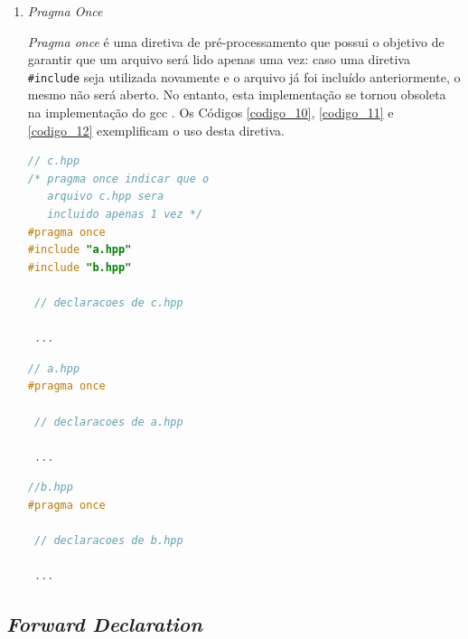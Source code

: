 \begin{enumerate}
\item \textit{Pragma Once}

\textit{Pragma once} é uma diretiva de pré-processamento que possui o objetivo de
 garantir que um arquivo será lido apenas uma vez: caso uma diretiva 
\texttt{\#include} seja utilizada novamente e o arquivo já foi incluído anteriormente,
 o mesmo não será aberto. No entanto, esta implementação se tornou obsoleta 
 na implementação do gcc \cite{gccpragmaonce}. Os Códigos \ref{codigo_10}, \ref{codigo_11} e \ref{codigo_12} exemplificam o uso desta diretiva.



\begin{lstlisting}[language=C++,caption={
                Arquivo c.hpp com guarda de inclusão \texttt{\#pragma once}},
                                                            label=codigo_10]
// c.hpp
/* pragma once indicar que o 
   arquivo c.hpp sera
   incluido apenas 1 vez */
#pragma once            
#include "a.hpp"
#include "b.hpp"

 // declaracoes de c.hpp

 ...

\end{lstlisting}

\begin{lstlisting}[language=C++,caption={
               Arquivo a.hpp com guarda de inclusão \texttt{\#pragma once}},
                                                            label=codigo_11]
// a.hpp
#pragma once 

 // declaracoes de a.hpp

 ...

\end{lstlisting}

\begin{lstlisting}[language=C++,caption={ 
              Arquivo b.hpp com guarda de inclusão \texttt{ \#pragma once}},
                                                            label=codigo_12]
//b.hpp
#pragma once 

 // declaracoes de b.hpp

 ...

\end{lstlisting}

\end{enumerate}

\subsection{\textit{Forward Declaration}}\label{forward_declaration_section}

